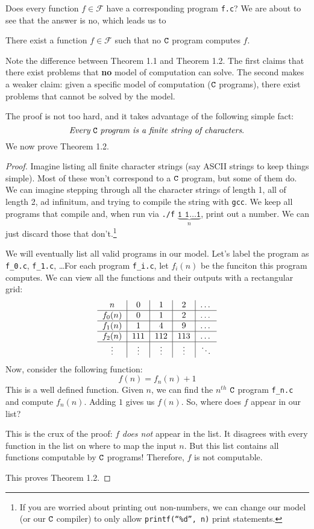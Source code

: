 \documentclass[english, 12pt]{article}
\begin{document}
  Does every function $f \in \mathcal{F}$ have a corresponding program 
  \texttt{f.c}? We are about to see that the answer is no, which leads us
  to
  \begin{thrm} There exist a function $f \in \mathcal{F}$ such that no
               ${\texttt{C}}$ program computes $f$.
  \end{thrm}
  Note the difference between Theorem 1.1 and Theorem 1.2. The first claims
  that there exist problems that {\bf no} model of computation can solve. The
  second makes a weaker claim: given a specific model of computation (${\texttt{C}}$ 
  programs), there exist problems that cannot be solved by the model.

  The proof is not too hard, and it takes advantage of the following simple
  fact:\[\text{ 
  {\it Every} ${\texttt{C}}$ {\it program is a finite string of characters}.
  }\]
  We now prove Theorem 1.2.
  \begin{proof}
  Imagine listing {all finite character strings} (say ASCII strings to 
  keep things simple). Most of these won't correspond to a ${\texttt{C}}$ program,
  but some of them do. We can imagine stepping through all the character 
  strings of length 1, all of length 2, ad infinitum, and trying to compile
  the string with \texttt{gcc}. We keep all programs that compile and,
  when run via 
  \texttt{./f} $\underbrace{\texttt{1 1}\dots\texttt{1}}_{n}$, print out
  a number. We can just discard those that don't.\footnote{If you are worried
  about printing out non-numbers, we can change our model (or our 
  ${\texttt{C}}$ compiler) to only allow \texttt{printf(``\%d'', n)} print
  statements.} \n

  We will eventually list all valid programs in our model. Let's label
  the program as \texttt{f\_0.c}, \texttt{f\_1.c}, \dots For each program
  \texttt{f\_i.c}, let $f_i(n)$ be the funciton this program computes.
  We can view all the functions and their outputs with a rectangular grid:
\[
\begin{tabular}{c|c|c|c|c}
$n$             & $0$   & $1$   & $2$   & \dots \\
\hline
$f_0(n)$ & $0$   & $1$   & $2$   & \dots \\
\hline
$f_1(n)$ & $1$   & $4$   & $9$   & \dots \\
\hline
$f_2(n)$ & $111$ & $112$ & $113$ & \dots \\
\hline
\vdots & \vdots & \vdots & \vdots & $\ddots$
\end{tabular}
\]
  Now, consider the following function:
  \[ f(n) = f_n(n) + 1 \]
  This is a well defined function. Given $n$, we can find the $n^{th}$ ${\texttt{C}}$
  program \texttt{f\_n.c} and compute $f_n(n)$. Adding \(1\) gives us $f(n)$.
  So, where does $f$ appear in our list?\n

  This is the crux of the proof: $f$ {\it does not} appear in the list. 
  It disagrees with every function in the list on where to map the input
  $n$. But this list contains all functions computable by ${\texttt{C}}$ programs! 
  Therefore, $f$ is not computable.\n

  This proves Theorem 1.2.
  \end{proof}
\end{document}
